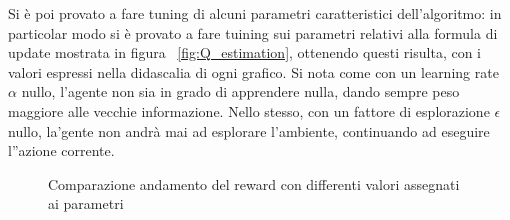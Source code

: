 \newpage
Si è poi provato a fare tuning di alcuni parametri caratteristici dell'algoritmo: in particolar modo si è provato a fare tuining sui parametri relativi alla formula di update mostrata in figura ~\ref{fig:Q_estimation}, ottenendo questi risulta, con i valori espressi nella didascalia di ogni grafico.
Si nota come con un learning rate $\alpha$ nullo, l'agente non sia in grado di apprendere nulla, dando sempre peso maggiore alle vecchie informazione. 
Nello stesso, con un fattore di esplorazione $\epsilon$ nullo, la'gente non andrà mai ad esplorare l'ambiente, continuando ad eseguire l''azione corrente.
\newpage


\begin{figure}[!h]
	\hfill 
	\caption{Comparazione andamento del reward con differenti valori assegnati ai parametri}
\end{figure}

